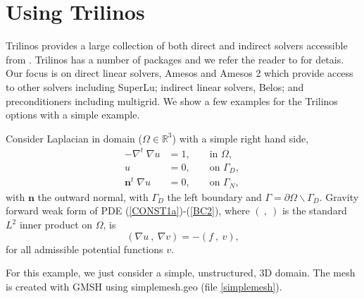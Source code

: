 
%
%
%

\chapter{Using Trilinos}
\label{TRILINOS}
Trilinos provides a large collection of both direct and indirect solvers accessible from \escript.  Trilinos has a number of packages and we refer the reader to \cite{TrilinosWeb} for detais.  Our focus is on direct linear solvers, Amesos and Amesos 2 which provide access to other solvers including SuperLu; indirect linear solvers, Belos; and preconditioners including multigrid.  We show a few examples for the Trilinos options with a simple example.

Consider Laplacian in domain ($\Omega\in \mathbb{R}^3$) with a simple right hand side,
\begin{align}
 -\nabla^t\; \nabla u &= 1,  &&\text{ in } \Omega, \label{CONST1a}\\
 u &= 0, &&\text{ on } \Gamma_D,\label{BC1}\\
 \mathbf{n}^t \; \nabla u &= 0, &&\text{ on }\Gamma_N,\,\label{BC2}
\end{align} 
with $\mathbf{n}$ the outward normal, with $\Gamma_D$ the left boundary and $\Gamma=\partial\Omega\backslash\Gamma_D$.  Gravity forward weak form of PDE (\ref{CONST1a})-(\ref{BC2}), where $(~,~)$ is the standard $L^2$ inner product on $\Omega$, is
\begin{equation}\label{weak}
(\nabla u ~,~\nabla v ) = -(f ~,~v ),   
\end{equation}
for all admissible potential functions $v$. 


For this example, we just consider a simple, unstructured, 3D domain.  The mesh is created with GMSH using simplemesh.geo (file \ref{simplemesh}).  

